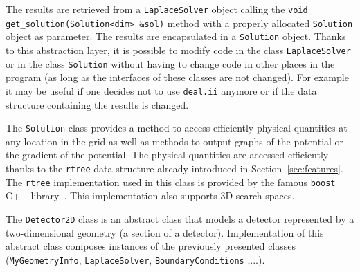 \documentclass[11pt]{article}
\begin{document}
The results are retrieved from a \texttt{LaplaceSolver} object
 calling the \lstinline{void get_solution(Solution<dim> &sol)}
method with a properly allocated \texttt{Solution} object as parameter.
The results are encapsulated in a \texttt{Solution} object. Thanks to this
abstraction layer, it is possible to modify code in the class \texttt{LaplaceSolver}
or in the class \texttt{Solution} without having to change code in other
places in the program (as long as the interfaces of these classes are not
changed). For example it may be useful if one decides not to use \texttt{deal.ii}
anymore or if the data structure containing the results is changed.

The \texttt{Solution} class provides a method to access efficiently physical
quantities at any location in the grid as well as methods to output graphs
of the potential or the gradient of the potential. The physical quantities
are accessed efficiently thanks to the \texttt{rtree} data structure already
introduced in Section~\ref{sec:features}. The \texttt{rtree} implementation
used in this class is provided by the famous \texttt{boost} C++ library~\cite{boost.rtree}.
This implementation also supports 3D search spaces.

	The \texttt{Detector2D} class is an abstract class that models a detector
	represented by a two-dimensional geometry (a section of a detector). Implementation
	of this abstract class composes instances of the previously presented classes
	(\texttt{MyGeometryInfo}, \texttt{LaplaceSolver}, \texttt{BoundaryConditions}
	,...).
\end{document}

